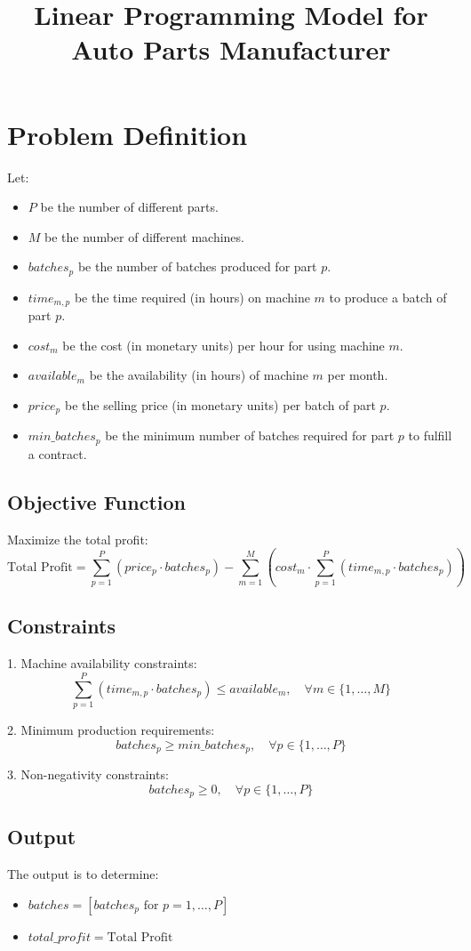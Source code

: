 \documentclass{article}
\begin{document}
\title{Linear Programming Model for Auto Parts Manufacturer}
\author{}
\date{}
\maketitle

\section*{Problem Definition}

Let:
\begin{itemize}
    \item $P$ be the number of different parts.
    \item $M$ be the number of different machines.
    \item $batches_{p}$ be the number of batches produced for part $p$.
    \item $time_{m,p}$ be the time required (in hours) on machine $m$ to produce a batch of part $p$.
    \item $cost_{m}$ be the cost (in monetary units) per hour for using machine $m$.
    \item $available_{m}$ be the availability (in hours) of machine $m$ per month.
    \item $price_{p}$ be the selling price (in monetary units) per batch of part $p$.
    \item $min\_batches_{p}$ be the minimum number of batches required for part $p$ to fulfill a contract.
\end{itemize}

\subsection*{Objective Function}
Maximize the total profit:
\[
\text{Total Profit} = \sum_{p=1}^{P} (price_{p} \cdot batches_{p}) - \sum_{m=1}^{M} (cost_{m} \cdot \sum_{p=1}^{P} (time_{m,p} \cdot batches_{p}))
\]

\subsection*{Constraints}
1. Machine availability constraints:
\[
\sum_{p=1}^{P} (time_{m,p} \cdot batches_{p}) \leq available_{m}, \quad \forall m \in \{1, \ldots, M\}
\]

2. Minimum production requirements:
\[
batches_{p} \geq min\_batches_{p}, \quad \forall p \in \{1, \ldots, P\}
\]

3. Non-negativity constraints:
\[
batches_{p} \geq 0, \quad \forall p \in \{1, \ldots, P\}
\]

\subsection*{Output}
The output is to determine:
\begin{itemize}
    \item $batches = [batches_{p} \text{ for } p=1, \ldots, P]$
    \item $total\_profit = \text{Total Profit}$
\end{itemize}
\end{document}
